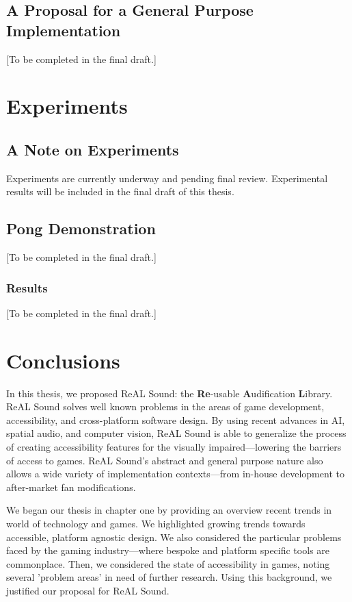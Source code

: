 \documentclass{report}
\newcommand{\rs}{ReAL Sound\xspace}
\newcommand{\rsfull}{\textbf{Re}-usable \textbf{A}udification \textbf{L}ibrary\xspace}
\begin{document}
\section{A Proposal for a General Purpose Implementation}
[To be completed in the final draft.]

\chapter{Experiments} 

\section{A Note on Experiments}
Experiments are currently underway and pending final review. Experimental results will be included in the final draft of this thesis. 

\section{Pong Demonstration}
[To be completed in the final draft.]

\subsection{Results}
[To be completed in the final draft.]

\chapter{Conclusions}
In this thesis, we proposed \rs: the \rsfull. \rs solves well known problems in the areas of game development, accessibility, and cross-platform software design. By using recent advances in AI, spatial audio, and computer vision, \rs is able to generalize the process of creating accessibility features for the visually impaired---lowering the barriers of access to games. \rs's abstract and general purpose nature also allows a wide variety of implementation contexts---from in-house development to after-market fan modifications.

We began our thesis in chapter one by providing an overview recent trends in world of technology and games. We highlighted growing trends towards accessible, platform agnostic design. We also considered the particular problems faced by the gaming industry---where bespoke and platform specific tools are commonplace. Then, we considered the state of accessibility in games, noting several 'problem areas' in need of further research. Using this background, we justified our proposal for \rs. 
\end{document}
